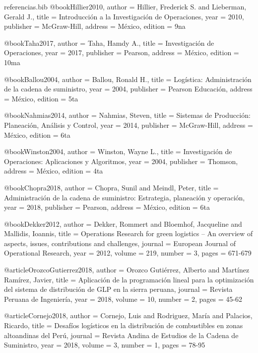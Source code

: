 \documentclass[11pt, a4paper]{article}
\begin{document}
\begin{filecontents}{referencias.bib}
@book{Hillier2010,
  author = {Hillier, Frederick S. and Lieberman, Gerald J.},
  title = {Introducción a la Investigación de Operaciones},
  year = {2010},
  publisher = {McGraw-Hill},
  address = {México},
  edition = {9na}
}

@book{Taha2017,
  author = {Taha, Hamdy A.},
  title = {Investigación de Operaciones},
  year = {2017},
  publisher = {Pearson},
  address = {México},
  edition = {10ma}
}

@book{Ballou2004,
  author = {Ballou, Ronald H.},
  title = {Logística: Administración de la cadena de suministro},
  year = {2004},
  publisher = {Pearson Educación},
  address = {México},
  edition = {5ta}
}

@book{Nahmias2014,
  author = {Nahmias, Steven},
  title = {Sistemas de Producción: Planeación, Análisis y Control},
  year = {2014},
  publisher = {McGraw-Hill},
  address = {México},
  edition = {6ta}
}

@book{Winston2004,
  author = {Winston, Wayne L.},
  title = {Investigación de Operaciones: Aplicaciones y Algoritmos},
  year = {2004},
  publisher = {Thomson},
  address = {México},
  edition = {4ta}
}

@book{Chopra2018,
  author = {Chopra, Sunil and Meindl, Peter},
  title = {Administración de la cadena de suministro: Estrategia, planeación y operación},
  year = {2018},
  publisher = {Pearson},
  address = {México},
  edition = {6ta}
}

@book{Dekker2012,
  author = {Dekker, Rommert and Bloemhof, Jacqueline and Mallidis, Ioannis},
  title = {Operations Research for green logistics – An overview of aspects, issues, contributions and challenges},
  journal = {European Journal of Operational Research},
  year = {2012},
  volume = {219},
  number = {3},
  pages = {671-679}
}

@article{OrozcoGutierrez2018,
  author = {Orozco Gutiérrez, Alberto and Martínez Ramírez, Javier},
  title = {Aplicación de la programación lineal para la optimización del sistema de distribución de GLP en la sierra peruana},
  journal = {Revista Peruana de Ingeniería},
  year = {2018},
  volume = {10},
  number = {2},
  pages = {45-62}
}

@article{Cornejo2018,
  author = {Cornejo, Luis and Rodriguez, María and Palacios, Ricardo},
  title = {Desafíos logísticos en la distribución de combustibles en zonas altoandinas del Perú},
  journal = {Revista Andina de Estudios de la Cadena de Suministro},
  year = {2018},
  volume = {3},
  number = {1},
  pages = {78-95}
}


\end{filecontents}
\end{document}
